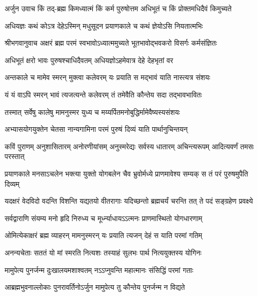 {अर्जुन उवाच}
\twolineshloka
{किं तद्-ब्रह्म किमध्यात्मं किं कर्म पुरुषोत्तम}
{अधिभूतं च किं प्रोक्तमधिदैवं किमुच्यते}%

\twolineshloka
{अधियज्ञः कथं कोऽत्र देहेऽस्मिन् मधुसूदन}
{प्रयाणकाले च कथं ज्ञेयोऽसि नियतात्मभिः}%

{श्रीभगवानुवाच}
\twolineshloka
{अक्षरं ब्रह्म परमं स्वभावोऽध्यात्ममुच्यते}
{भूतभावोद्भवकरो विसर्गः कर्मसंज्ञितः}%

\twolineshloka
{अधिभूतं क्षरो भावः पुरुषश्चाधिदैवतम्}
{अधियज्ञोऽहमेवात्र देहे देहभृतां वर}%

\twolineshloka
{अन्तकाले च मामेव स्मरन् मुक्त्वा कलेवरम्}
{यः प्रयाति स मद्भावं याति नास्त्यत्र संशयः}%

\twolineshloka
{यं यं वाऽपि स्मरन् भावं त्यजत्यन्ते कलेवरम्}
{तं तमेवैति कौन्तेय सदा तद्भावभावितः}%

\twolineshloka
{तस्मात् सर्वेषु कालेषु मामनुस्मर युध्य च}
{मय्यर्पितमनोबुद्धिर्मामेवैष्यस्यसंशयः}%

\twolineshloka
{अभ्यासयोगयुक्तेन चेतसा नान्यगामिना}
{परमं पुरुषं दिव्यं याति पार्थानुचिन्तयन्}%

\fourlineindentedshloka
{कविं पुराणम् अनुशासितारम्}
{अनोरणीयांसम् अनुस्मरेद्यः}
{सर्वस्य धातारम् अचिन्त्यरूपम्}
{आदित्यवर्णं तमसः परस्तात्}%

\fourlineindentedshloka
{प्रयाणकाले मनसाऽचलेन}
{भक्त्या युक्तो योगबलेन चैव}
{भ्रुवोर्मध्ये प्राणमावेश्य सम्यक्}
{स तं परं पुरुषमुपैति दिव्यम्}%

\fourlineindentedshloka
{यदक्षरं वेदविदो वदन्ति}
{विशन्ति यद्यतयो वीतरागाः}
{यदिच्छन्तो ब्रह्मचर्यं चरन्ति}
{तत् ते पदं सङ्ग्रहेण प्रवक्ष्ये}%

\twolineshloka
{सर्वद्वाराणि संयम्य मनो हृदि निरुध्य च}
{मूर्ध्न्याधायऽऽत्मनः प्राणमास्थितो योगधारणाम्}%

\twolineshloka
{ओमित्येकाक्षरं ब्रह्म व्याहरन् मामनुस्मरन्}
{यः प्रयाति त्यजन् देहं स याति परमां गतिम्}%

\twolineshloka
{अनन्यचेताः सततं यो मां स्मरति नित्यशः}
{तस्याहं सुलभः पार्थ नित्ययुक्तस्य योगिनः}%

\twolineshloka
{मामुपेत्य पुनर्जन्म दुःखालयमशाश्वतम्}
{नऽऽप्नुवन्ति महात्मानः संसिद्धिं परमां गताः}%

\twolineshloka
{आब्रह्मभुवनाल्लोकाः पुनरावर्तिनोऽर्जुन}
{मामुपेत्य तु कौन्तेय पुनर्जन्म न विद्यते}%

